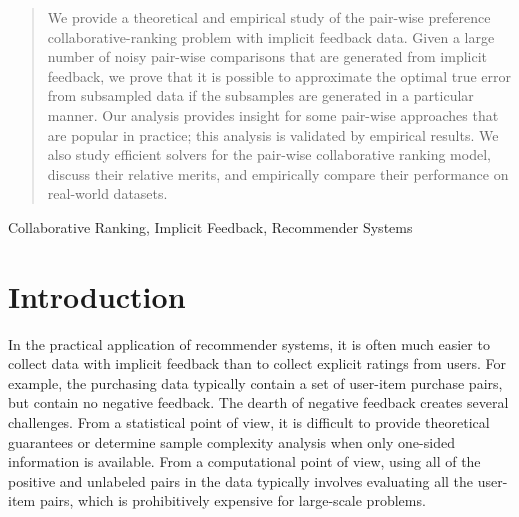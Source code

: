 \documentclass[conference]{IEEEtran}
\numberwithin{equation}{section}
\newtheorem{sampling strategy}{Sampling Strategy}
\begin{document}
\begin{abstract} 

We provide a theoretical and empirical study of the pair-wise preference collaborative-ranking problem with implicit feedback data. Given a large number of noisy pair-wise comparisons that are generated from implicit feedback, we prove that it is possible to approximate the optimal true error from subsampled data if the subsamples are generated in a particular manner. Our analysis provides insight for some pair-wise approaches that are popular in practice; this analysis is validated by empirical results. We also study  efficient solvers for the pair-wise collaborative ranking  model, discuss their relative merits, and empirically compare their performance on real-world datasets.

\end{abstract} 

\begin{IEEEkeywords}
Collaborative Ranking, Implicit Feedback, Recommender Systems
\end{IEEEkeywords}

\section{Introduction}
\label{sec:intro}


In the practical application of recommender systems, it is often much easier to collect data with implicit feedback than to collect explicit ratings from users.  For example, the purchasing data typically contain a set of user-item purchase pairs, but contain no negative feedback. The dearth of negative feedback creates several challenges. From a statistical point of view, it is difficult to provide theoretical guarantees or determine sample complexity analysis when only one-sided information is available. From a computational point of view, using all of the positive and unlabeled pairs in the data typically involves evaluating all the user-item pairs, which is prohibitively expensive for large-scale problems. 
\end{document}
